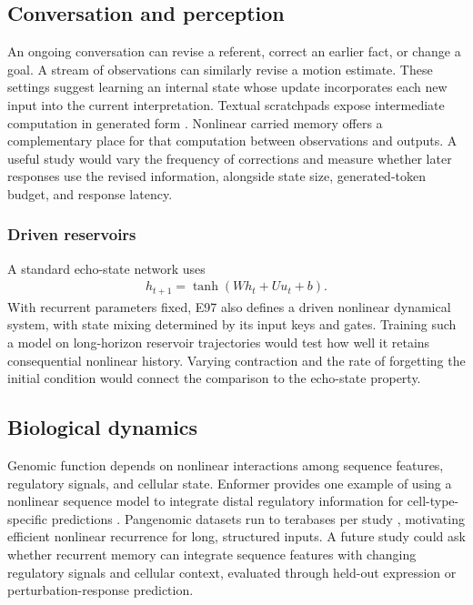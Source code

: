 \documentclass[10pt]{article}
\theoremstyle{canonical}
\theoremstyle{canonicalbullet}
\begin{document}
\subsection*{Conversation and perception}


An ongoing conversation can revise a referent, correct an earlier fact, or change a goal. A stream of observations can similarly revise a motion estimate. These settings suggest learning an internal state whose update incorporates each new input into the current interpretation. Textual scratchpads expose intermediate computation in generated form \citep{nye2021scratchpads} \citep{wei2022chain}. Nonlinear carried memory offers a complementary place for that computation between observations and outputs. A useful study would vary the frequency of corrections and measure whether later responses use the revised information, alongside state size, generated-token budget, and response latency.


\subsubsection*{Driven reservoirs}


A standard echo-state network \citep{jaeger2001} uses
\[\begin{aligned}{h }_{t + 1} =  \operatorname{tanh}( W  {h }_{t } +  U  {u }_{t } +  b ) . \end{aligned}\]
 With recurrent parameters fixed, E97 also defines a driven nonlinear dynamical system, with state mixing determined by its input keys and gates. Training such a model on long-horizon reservoir trajectories would test how well it retains consequential nonlinear history. Varying contraction and the rate of forgetting the initial condition would connect the comparison to the echo-state property.


\subsection*{Biological dynamics}


Genomic function depends on nonlinear interactions among sequence features, regulatory signals, and cellular state. Enformer provides one example of using a nonlinear sequence model to integrate distal regulatory information for cell-type-specific predictions \citep{avsec2021enformer}. Pangenomic datasets run to terabases per study \citep{hprc2023} \citep{guarracino2023acrocentric} \citep{pggb2024}, motivating efficient nonlinear recurrence for long, structured inputs. A future study could ask whether recurrent memory can integrate sequence features with changing regulatory signals and cellular context, evaluated through held-out expression or perturbation-response prediction.
\end{document}
